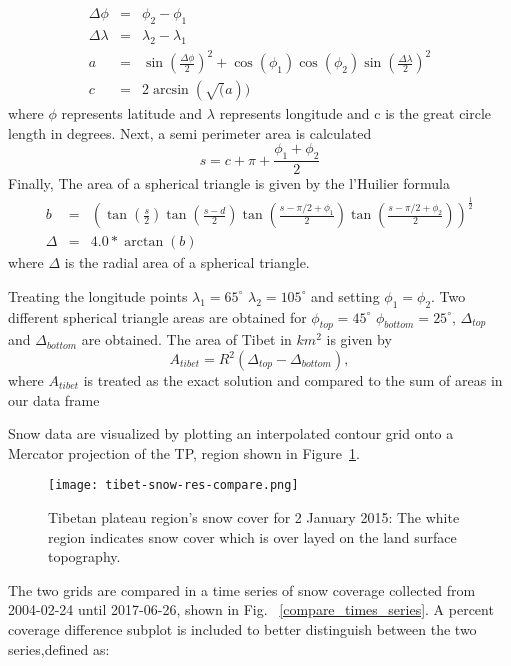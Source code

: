 \begin{eqnarray}
\Delta \phi &=& \phi_{2} - \phi_{1} \\
\Delta \lambda &=& \lambda_2- \lambda_1 \\
a &=& \sin(\frac{\Delta \phi}{2})^{2} + \cos(\phi_1)  \cos(\phi_2)  \sin(\frac{\Delta \lambda}{2})^{2} \\
c &=& 2  \arcsin(\sqrt(a))
\end{eqnarray}
where $\phi$ represents latitude and $\lambda$ represents longitude and c is the great circle length in degrees.
Next, a semi perimeter area is calculated
\begin{equation}
s = c + \pi + \frac{\phi_{1} + \phi_{2}}{2}
\end{equation}
Finally, The area of a spherical triangle is given by the l'Huilier formula
\begin{eqnarray}
b &=& \left(
\tan(\frac{s}{2})
\tan(\frac{s-d}{2})
\tan(\frac{s - \pi/2 + \phi_{1}}{2})
\tan(\frac{s - \pi/2 + \phi_{2}}{2}) \right)^{\frac{1}{2}} \\
\Delta &=& 4.0 * \arctan(b)
\end{eqnarray}
where $\Delta$ is the radial area of a spherical triangle. 

Treating the longitude points $\lambda_1 = 65^{\circ}$ $\lambda_2 = 105^{\circ}$ and setting $\phi_{1} = \phi_{2}$. Two different spherical triangle areas are obtained for $\phi_{top} = 45^{\circ}$ $\phi_{bottom} = 25^{\circ}$, $\Delta_{top}$ and $\Delta_{bottom}$ are obtained. The area of Tibet in $km^2$ is given by 
\begin{equation}
A_{tibet} = R^2(\Delta_{top} - \Delta_{bottom}),
\end{equation}
where $A_{tibet}$ is treated as the exact solution and compared to the sum of areas in our data frame


Snow data are visualized by plotting an interpolated contour grid onto a Mercator projection of the TP, region shown in Figure~\ref{compare_grids}.
\begin{figure}[ht]
\centering
\begin{minipage}{6in}
\texttt{[image: tibet-snow-res-compare.png]}
\caption{Tibetan plateau region's snow cover for 2 January 2015: The white region indicates snow cover which is over layed on the land surface topography.}
\label{compare_grids}
\end{minipage}
\end{figure}
The two grids are compared in a time series of snow coverage collected from 2004-02-24 until 2017-06-26, shown in Fig. ~\ref{compare_times_series}. A percent coverage difference subplot is included to better distinguish between the two series,defined as:

